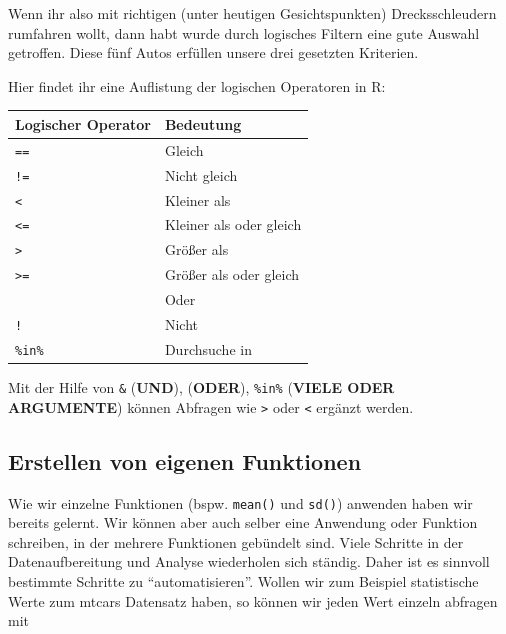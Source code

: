 \documentclass[
]{article}
\begin{document}
Wenn ihr also mit richtigen (unter heutigen Gesichtspunkten) Drecksschleudern rumfahren wollt, dann habt wurde durch logisches Filtern eine gute Auswahl getroffen. Diese fünf Autos erfüllen unsere drei gesetzten Kriterien.

Hier findet ihr eine Auflistung der logischen Operatoren in R:

\begin{longtable}[]{@{}ll@{}}
\toprule
Logischer Operator & Bedeutung \\
\midrule
\endhead
\texttt{==} & Gleich \\
\texttt{!=} & Nicht gleich \\
\texttt{\textless{}} & Kleiner als \\
\texttt{\textless{}=} & Kleiner als oder gleich \\
\texttt{\textgreater{}} & Größer als \\
\texttt{\textgreater{}=} & Größer als oder gleich \\
\texttt{\textbar{}} & Oder \\
\texttt{!} & Nicht \\
\texttt{\%in\%} & Durchsuche in \\
\bottomrule
\end{longtable}

Mit der Hilfe von \texttt{\&} (\textbf{UND}), \texttt{\textbar{}} (\textbf{ODER}), \texttt{\%in\%} (\textbf{VIELE ODER ARGUMENTE}) können Abfragen wie \texttt{\textgreater{}} oder \texttt{\textless{}} ergänzt werden.

\hypertarget{erstellen-von-eigenen-funktionen}{%
\subsection{Erstellen von eigenen Funktionen}\label{erstellen-von-eigenen-funktionen}}

Wie wir einzelne Funktionen (bspw. \texttt{mean()} und \texttt{sd()}) anwenden haben wir bereits gelernt. Wir können aber auch selber eine Anwendung oder Funktion schreiben, in der mehrere Funktionen gebündelt sind. Viele Schritte in der Datenaufbereitung und Analyse wiederholen sich ständig. Daher ist es sinnvoll bestimmte Schritte zu ``automatisieren''. Wollen wir zum Beispiel statistische Werte zum mtcars Datensatz haben, so können wir jeden Wert einzeln abfragen mit
\end{document}
